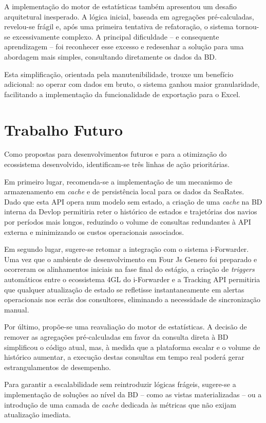 \documentclass[a4paper,12pt]{report}
\begin{document}
A implementação do motor de estatísticas também apresentou um desafio arquitetural inesperado. A lógica inicial, baseada em agregações pré-calculadas, revelou-se frágil e, após uma primeira tentativa de refatoração, o sistema tornou-se excessivamente complexo. A principal dificuldade -- e consequente aprendizagem -- foi reconhecer esse excesso e redesenhar a solução para uma abordagem mais simples, consultando diretamente os dados da BD.

Esta simplificação, orientada pela manutenibilidade, trouxe um benefício adicional: ao operar com dados em bruto, o sistema ganhou maior granularidade, facilitando a implementação da funcionalidade de exportação para o Excel.

\section{Trabalho Futuro}

Como propostas para desenvolvimentos futuros e para a otimização do ecossistema desenvolvido, identificam-se três linhas de ação prioritárias.

Em primeiro lugar, recomenda-se a implementação de um mecanismo de armazenamento em \textit{cache} e de persistência local para os dados da SeaRates. Dado que esta API opera num modelo sem estado, a criação de uma \textit{cache} na BD interna da Devlop permitiria reter o histórico de estados e trajetórias dos navios por períodos mais longos, reduzindo o volume de consultas redundantes à API externa e minimizando os custos operacionais associados.

Em segundo lugar, sugere-se retomar a integração com o sistema i-Forwarder. Uma vez que o ambiente de desenvolvimento em Four Js Genero foi preparado e ocorreram os alinhamentos iniciais na fase final do estágio, a criação de \textit{triggers} automáticos entre o ecossistema 4GL do i-Forwarder e a Tracking API permitiria que qualquer atualização de estado se refletisse instantaneamente em alertas operacionais nos ecrãs dos consultores, eliminando a necessidade de sincronização manual.

Por último, propõe-se uma reavaliação do motor de estatísticas. A decisão de remover as agregações pré-calculadas em favor da consulta direta à BD simplificou o código atual, mas, à medida que a plataforma escalar e o volume de histórico aumentar, a execução destas consultas em tempo real poderá gerar estrangulamentos de desempenho.

Para garantir a escalabilidade sem reintroduzir lógicas frágeis, sugere-se a implementação de soluções ao nível da BD -- como as vistas materializadas -- ou a introdução de uma camada de \textit{cache} dedicada às métricas que não exijam atualização imediata.
\end{document}
